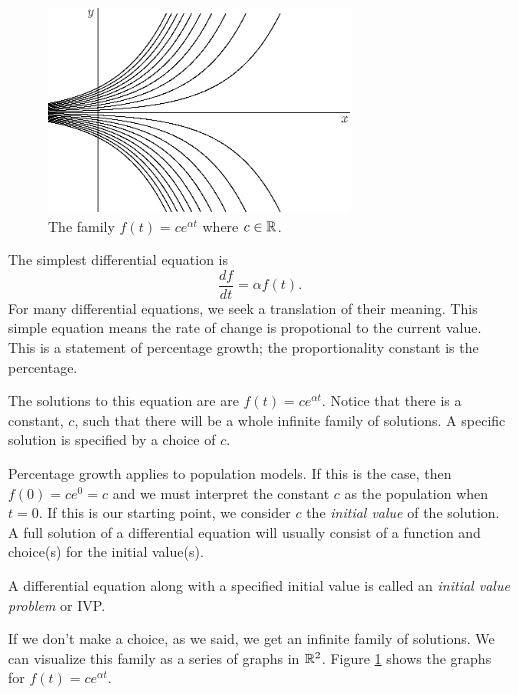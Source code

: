 \documentclass[fleqn,letterpaper]{report}
\begin{document}
\begin{figure}[t]
\centering
\includegraphics[width=8cm]{figure01.eps}
\caption{The family $f(t) = ce^{\alpha t}$ where $c \in \mathbb{R}$.}
\label{figure-family-of-solutions}
\end{figure}

\begin{example}
The simplest differential equation is 
\begin{equation*}
\frac{df}{dt} = \alpha f(t).
\end{equation*}
For many differential equations, we seek a translation of their
meaning. This simple equation means the rate of change is
propotional to the current value. This is a statement of
percentage growth; the proportionality constant is the
percentage.
\end{example}

The solutions to this equation are are $f(t) = ce^{\alpha t}$.
Notice that there is a constant, $c$, such that there will be
a whole infinite family of solutions. A specific solution is
specified by a choice of $c$. 

Percentage growth applies to population models.
If this is the case, then $f(0) = ce^0 = c$ and we must
interpret the constant $c$ as the population when $t=0$.
If this is our starting point, we consider $c$ the
\emph{initial value} of the solution. A full solution of a
differential equation will usually consist of a function and
choice(s) for the initial value(s). 

\begin{defn}
A differential equation along with a specified initial value
is called an \emph{initial value problem} or IVP.
\end{defn}

If we don't make a choice, as we said, we get an infinite
family of solutions. We can visualize this family as a series
of graphs in $\mathbb{R}^2$. Figure \ref{figure-family-of-solutions} shows
the graphs for $f(t) = ce^{\alpha t}$. 
\end{document}

